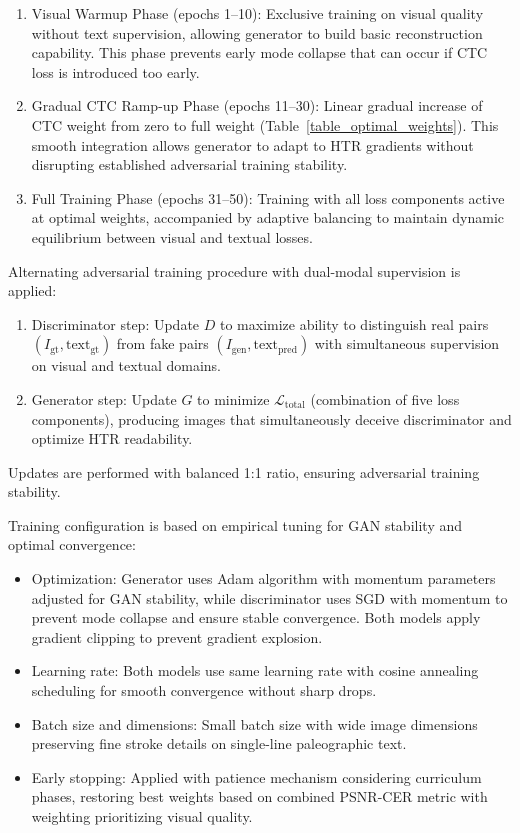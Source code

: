 \documentclass[journal]{IEEEtran}
\begin{document}
\begin{enumerate}
    \item Visual Warmup Phase (epochs 1--10): Exclusive training on visual quality without text supervision, allowing generator to build basic reconstruction capability. This phase prevents early mode collapse that can occur if CTC loss is introduced too early.
    
    \item Gradual CTC Ramp-up Phase (epochs 11--30): Linear gradual increase of CTC weight from zero to full weight (Table~\ref{table_optimal_weights}). This smooth integration allows generator to adapt to HTR gradients without disrupting established adversarial training stability.
    
    \item Full Training Phase (epochs 31--50): Training with all loss components active at optimal weights, accompanied by adaptive balancing to maintain dynamic equilibrium between visual and textual losses.
\end{enumerate}

Alternating adversarial training procedure with dual-modal supervision is applied:
\begin{enumerate}
    \item Discriminator step: Update $D$ to maximize ability to distinguish real pairs $(I_{\text{gt}}, \text{text}_{\text{gt}})$ from fake pairs $(I_{\text{gen}}, \text{text}_{\text{pred}})$ with simultaneous supervision on visual and textual domains.
    \item Generator step: Update $G$ to minimize $\mathcal{L}_{\text{total}}$ (combination of five loss components), producing images that simultaneously deceive discriminator and optimize HTR readability.
\end{enumerate}
Updates are performed with balanced 1:1 ratio, ensuring adversarial training stability.

Training configuration is based on empirical tuning for GAN stability and optimal convergence:

\begin{itemize}
    \item Optimization: Generator uses Adam algorithm with momentum parameters adjusted for GAN stability, while discriminator uses SGD with momentum to prevent mode collapse and ensure stable convergence. Both models apply gradient clipping to prevent gradient explosion.
    
    \item Learning rate: Both models use same learning rate with cosine annealing scheduling for smooth convergence without sharp drops.
    
    \item Batch size and dimensions: Small batch size with wide image dimensions preserving fine stroke details on single-line paleographic text.
    
    \item Early stopping: Applied with patience mechanism considering curriculum phases, restoring best weights based on combined PSNR-CER metric with weighting prioritizing visual quality.
\end{itemize}
\end{document}
